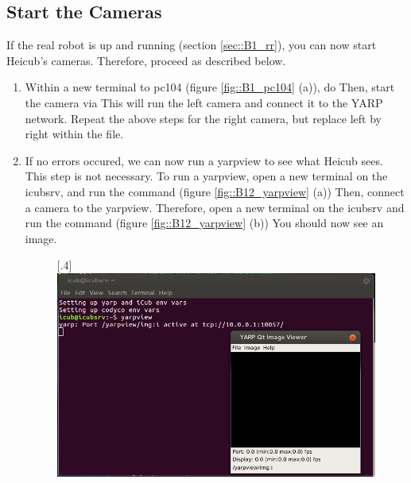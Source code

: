\subsection{Start the Cameras}
\label{sec::B12_sc}
If the real robot is up and running (section \ref{sec::B1_rr}), you can now start Heicub's cameras. Therefore, proceed as described below.
\begin{enumerate}
	\item Within a new terminal to pc104 (figure \ref{fig::B1_pc104} (a)), do \newline {}\newline Then, start the camera via \newline {}\newline This will run the left camera and connect it to the YARP network. Repeat the above steps for the right camera, but replace left by right within the  file.
	\item If no errors occured, we can now run a yarpview to see what Heicub sees. This step is not necessary. To run a yarpview, open a new terminal on the icubsrv, and run the command \newline {} (figure \ref{fig::B12_yarpview} (a)) \newline Then, connect a camera to the yarpview. Therefore, open a new terminal on the icubsrv and run the command \newline {} (figure \ref{fig::B12_yarpview} (b)) \newline You should now see an image.
	\begin{figure}[h!]
		\centering
		[.4\linewidth]{\includegraphics[scale=.22]{chapters/13_appendix/img/yarpview.png}}

\end{figure}
\end{enumerate}
